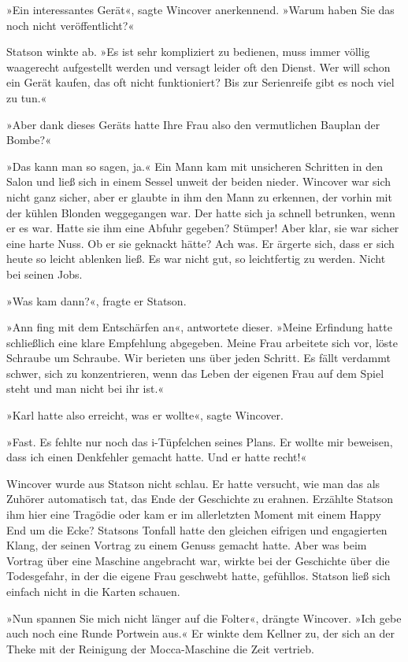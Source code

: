 »Ein interessantes Gerät«, sagte Wincover anerkennend. »Warum haben
Sie das noch nicht veröffentlicht?«

Statson winkte ab. »Es ist sehr kompliziert zu bedienen, muss immer
völlig waagerecht aufgestellt werden und versagt leider oft den
Dienst. Wer will schon ein Gerät kaufen, das oft nicht
funktioniert? Bis zur Serienreife gibt es noch viel zu tun.«

»Aber dank dieses Geräts hatte Ihre Frau also den vermutlichen
Bauplan der Bombe?«

»Das kann man so sagen, ja.« Ein Mann kam mit unsicheren Schritten
in den Salon und ließ sich in einem Sessel unweit der beiden
nieder. Wincover war sich nicht ganz sicher, aber er glaubte in ihm
den Mann zu erkennen, der vorhin mit der kühlen Blonden weggegangen
war. Der hatte sich ja schnell betrunken, wenn er es war. Hatte sie
ihm eine Abfuhr gegeben? Stümper! Aber klar, sie war sicher eine
harte Nuss. Ob er sie geknackt hätte? Ach was. Er ärgerte sich,
dass er sich heute so leicht ablenken ließ. Es war nicht gut, so
leichtfertig zu werden. Nicht bei seinen Jobs.

»Was kam dann?«, fragte er Statson.

»Ann fing mit dem Entschärfen an«, antwortete dieser. »Meine
Erfindung hatte schließlich eine klare Empfehlung abgegeben. Meine
Frau arbeitete sich vor, löste Schraube um Schraube. Wir berieten
uns über jeden Schritt. Es fällt verdammt schwer, sich zu
konzentrieren, wenn das Leben der eigenen Frau auf dem Spiel steht
und man nicht bei ihr ist.«

»Karl hatte also erreicht, was er wollte«, sagte Wincover.

»Fast. Es fehlte nur noch das i-Tüpfelchen seines Plans. Er wollte
mir beweisen, dass ich einen Denkfehler gemacht hatte. Und er hatte
recht!«

Wincover wurde aus Statson nicht schlau. Er hatte versucht, wie man
das als Zuhörer automatisch tat, das Ende der Geschichte zu
erahnen. Erzählte Statson ihm hier eine Tragödie oder kam er im
allerletzten Moment mit einem Happy End um die Ecke? Statsons
Tonfall hatte den gleichen eifrigen und engagierten Klang, der
seinen Vortrag zu einem Genuss gemacht hatte. Aber was beim Vortrag
über eine Maschine angebracht war, wirkte bei der Geschichte über
die Todesgefahr, in der die eigene Frau geschwebt hatte, gefühllos.
Statson ließ sich einfach nicht in die Karten schauen.

»Nun spannen Sie mich nicht länger auf die Folter«, drängte
Wincover. »Ich gebe auch noch eine Runde Portwein aus.« Er winkte
dem Kellner zu, der sich an der Theke mit der Reinigung der
Mocca-Maschine die Zeit vertrieb.

